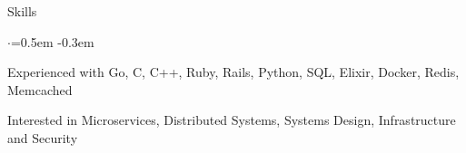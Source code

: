 \documentclass{resume} %
\begin{document}

\begin{rSection}{Skills}
  \vspace {0.3em}
  \begin{list}{$\cdot$}{\leftmargin=0.5em}
    \itemsep -0.3em \vspace{-0.3em}
    \item Experienced with Go, C, C++, Ruby, Rails, Python, SQL, Elixir, Docker, Redis,
      Memcached
    \item Interested in Microservices, Distributed Systems, Systems Design, Infrastructure
      and Security 
  \end{list}
  \vspace{0.3em}
\end{rSection}


\end{document}
